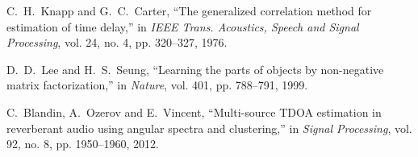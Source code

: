 \documentclass{article}
\begin{document}
\begin{thebibliography}{99}
	C.~H.~Knapp and G.~C.~Carter, 
	``The generalized correlation method for estimation of time delay,'' 
	in {\em IEEE Trans. Acoustics, Speech and Signal Processing}, vol. 24, no. 4, pp. 320--327, 1976. 

	D.~D.~Lee and H.~S.~Seung, 
	``Learning the parts of objects by non-negative matrix factorization,'' 
	in {\em Nature}, vol. 401, pp. 788--791, 1999.

	C.~Blandin, A.~Ozerov and E.~Vincent,
	``Multi-source TDOA estimation in reverberant audio using angular spectra and clustering,'' 
	in {\em Signal Processing}, vol. 92, no. 8, pp. 1950--1960, 2012.

\end{thebibliography}
\end{document}
